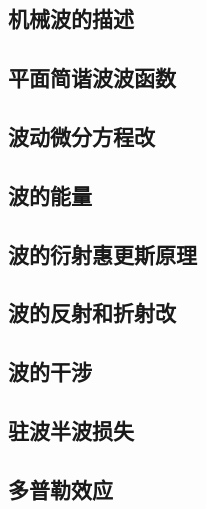 \documentclass[UTF8]{article}
\begin{document}
\subsection{机械波的描述}
\subsection{平面简谐波波函数}
\subsection{波动微分方程改}
\subsection{波的能量}
\subsection{波的衍射\;\;惠更斯原理}
\subsection{波的反射和折射改}
\subsection{波的干涉}
\subsection{驻波\;\;半波损失}
\subsection{多普勒效应}
\end{document}
